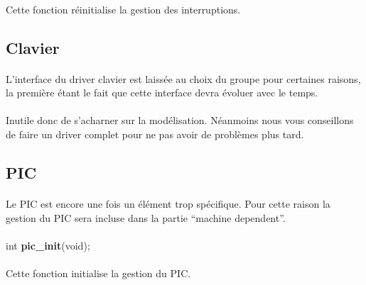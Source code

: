 \documentclass[10pt,a4wide]{article}
\begin{document}
\paragraph{}

Cette fonction r\'einitialise la gestion des interruptions.

\subsection{Clavier}

\paragraph{}

L'interface du driver clavier est laiss\'ee au choix du groupe pour certaines
raisons, la premi\`ere \'etant le fait que cette interface devra \'evoluer
avec le temps.

\paragraph{}

Inutile donc de s'acharner sur la mod\'elisation. N\'eanmoins nous vous
conseillons de faire un driver complet pour ne pas avoir de probl\`emes
plus tard.

\subsection{PIC}

\paragraph{}

Le PIC est encore une fois un \'el\'ement trop sp\'ecifique. Pour cette
raison la gestion du PIC sera incluse dans la partie ``machine dependent''.

\paragraph{}

\hspace{1.5cm}int \textbf{pic\_init}(void);

\paragraph{}

Cette fonction initialise la gestion du PIC.
\end{document}
